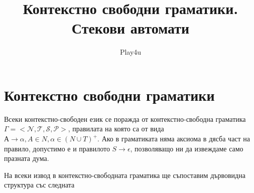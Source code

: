\documentclass[11pt]{article} %
\title{Контекстно свободни граматики. Стекови автомати}
\author{Play4u}
\begin{document}
\maketitle

\newcommand{\lrangle}[1]{\left\langle #1 \right\rangle}

\newcommand{\belongsTo}{\in}
\newcommand{\notBelongsTo}{\centernot\in}

\newcommand{\kda}{A = <Q, X, q_{0}, \delta, F>}
\newcommand{\cfg}{\Gamma = <\mathcal{N}, \mathcal{T}, \mathcal{S}, \mathcal{P}>}
\newcommand{\cfgVers}{G = \langle V, \Sigma, R, S \rangle}
\newcommand{\nsa}{A = <Q, X, Z, q_{0}, z_{0}, \delta, F>}

\newcommand{\italicBold}[1]{\textbf{\emph{#1}}}
\newcommand{\definition}{\italicBold{Дефиниция: }}
\newcommand{\theorem}{\italicBold{Теорема: }}
\newcommand{\lemma}{\italicBold{Лема: }}
\newcommand{\proof}{\italicBold{Доказателство: }}

\newcommand{\curlies}[1]{\{#1\}}

\newcommand{\enumNum}{\renewcommand{\theenumi}{\arabic{enumi}}}
\newcommand{\enumlet}{\renewcommand{\theenumi}{\alph{enumi}}}

\section{Контекстно свободни граматики}
Всеки контекстно-свободен език се поражда от контекстно-свободна граматика $\cfg$, правилата на която са от вида $А \to \alpha, A \in N, \alpha \in (N \cup T)^{+}$.
Ако в граматиката няма аксиома в дясба част на правило, допустимо е и правилото $S \to \epsilon$, позволяващо ни да извеждаме само празната дума. \par

На всеки извод в контекстно-свободната граматика ще  съпоставим дървовидна структура със следната 
\end{document}
